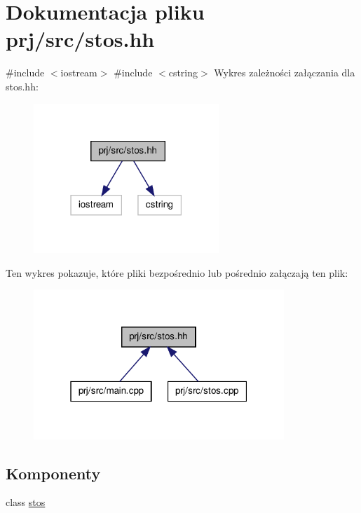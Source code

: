 \hypertarget{stos_8hh}{\section{\-Dokumentacja pliku prj/src/stos.hh}
\label{stos_8hh}
}
{\ttfamily \#include $<$iostream$>$}\*
{\ttfamily \#include $<$cstring$>$}\*
\-Wykres zależności załączania dla stos.\-hh\-:\nopagebreak
\begin{figure}[H]
\begin{center}
\leavevmode
\includegraphics[width=198pt]{stos_8hh__incl}
\end{center}
\end{figure}
\-Ten wykres pokazuje, które pliki bezpośrednio lub pośrednio załączają ten plik\-:\nopagebreak
\begin{figure}[H]
\begin{center}
\leavevmode
\includegraphics[width=268pt]{stos_8hh__dep__incl}
\end{center}
\end{figure}
\subsection*{\-Komponenty}
\begin{DoxyCompactItemize}
\item 
class \hyperlink{classstos}{stos}
\end{DoxyCompactItemize}
